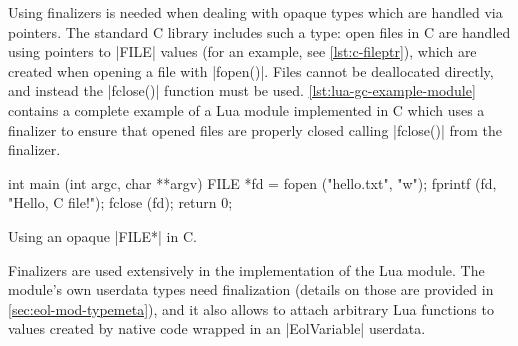 Using finalizers is needed when dealing with opaque types which are handled
via pointers. The standard C library includes such a type: open files in C are
handled using pointers to \Mc|FILE| values (for an example, see
\autoref{lst:c-fileptr}), which are created when opening a file with
\Mc|fopen()|. Files cannot be deallocated directly, and instead the
\Mc|fclose()| function must be used. \autoref{lst:lua-gc-example-module}
contains a complete example of a Lua module implemented in C which uses a
finalizer to ensure that opened files are properly closed calling
\Mc|fclose()| from the finalizer.

\begin{listing}[tH]
    \begin{ccode}
    int main (int argc, char **argv) {
        FILE *fd = fopen ("hello.txt", "w");
        fprintf (fd, "Hello, C file!\n");
        fclose (fd);
        return 0;
    }
    \end{ccode}
    \caption{Using an opaque \Mc|FILE*| in C.}
    \label{lst:c-fileptr}
\end{listing}

Finalizers are used extensively in the implementation of the \Eol* Lua module.
The module's own userdata types need finalization (details on those are
provided in \autoref{sec:eol-mod-typemeta}), and it also allows to attach
arbitrary Lua functions to values created by native code wrapped in an
\Mc|EolVariable| userdata.


